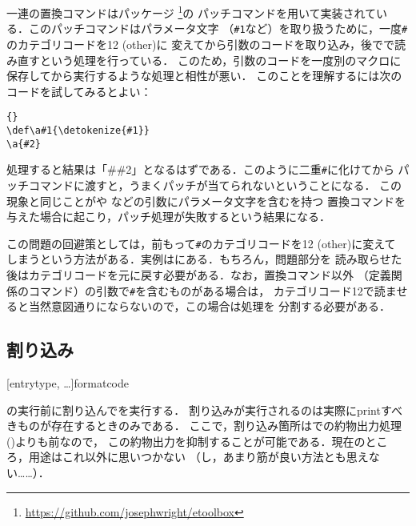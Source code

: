 \documentclass[lualatex,ja=standard,magstyle=real]{bxjsarticle}
\begin{document}
一連の置換コマンドはパッケージ
\footnote{\url{https://github.com/josephwright/etoolbox}}の
パッチコマンドを用いて実装されている．このパッチコマンドはパラメータ文字
（\texttt{\#1}など）を取り扱うために，一度\texttt{\#}のカテゴリコードを12 (other)に
変えてから引数のコードを取り込み，後でで読み直すという処理を行っている．
このため，引数のコードを一度別のマクロに保存してから実行するような処理と相性が悪い．
このことを理解するには次のコードを試してみるとよい：
\begin{lstlisting}[style=latex]{}
\def\a#1{\detokenize{#1}}
\a{#2}
\end{lstlisting}
処理すると結果は「\#\#2」となるはずである．このように二重\texttt{\#}に化けてから
パッチコマンドに渡すと，うまくパッチが当てられないということになる．
この現象と同じことがや
などの引数にパラメータ文字を含むを持つ
置換コマンドを与えた場合に起こり，パッチ処理が失敗するという結果になる．

この問題の回避策としては，前もって\texttt{\#}のカテゴリコードを12 (other)に変えて
しまうという方法がある．実例はにある．もちろん，問題部分を
読み取らせた後はカテゴリコードを元に戻す必要がある．なお，置換コマンド以外
（定義関係のコマンド）の引数で\texttt{\#}を含むものがある場合は，
カテゴリコード12で読ませると当然意図通りにならないので，この場合は処理を
分割する必要がある．

\subsection{割り込み}

\begin{ltxsyntax}
  [entrytype, \dots]{format}{code}

  の実行前に割り込んでを実行する．
  割り込みが実行されるのは実際にprintすべきものが存在するときのみである．
  ここで，割り込み箇所はでの約物出力処理()よりも前なので，
  この約物出力を抑制することが可能である．現在のところ，用途はこれ以外に思いつかない
  （し，あまり筋が良い方法とも思えない……）．
\end{ltxsyntax}
\end{document}
